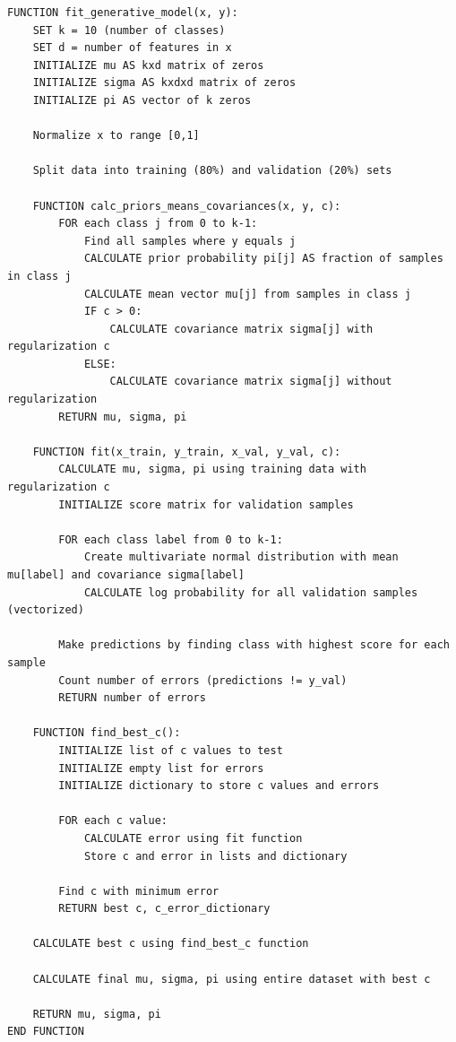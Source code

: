 \documentclass{article}
\begin{document}
\begin{lstlisting}[style=pseudocodestyle]
FUNCTION fit_generative_model(x, y):
    SET k = 10 (number of classes)
    SET d = number of features in x
    INITIALIZE mu AS kxd matrix of zeros
    INITIALIZE sigma AS kxdxd matrix of zeros
    INITIALIZE pi AS vector of k zeros

    Normalize x to range [0,1]

    Split data into training (80%) and validation (20%) sets

    FUNCTION calc_priors_means_covariances(x, y, c):
        FOR each class j from 0 to k-1:
            Find all samples where y equals j
            CALCULATE prior probability pi[j] AS fraction of samples in class j
            CALCULATE mean vector mu[j] from samples in class j
            IF c > 0:
                CALCULATE covariance matrix sigma[j] with regularization c
            ELSE:
                CALCULATE covariance matrix sigma[j] without regularization
        RETURN mu, sigma, pi

    FUNCTION fit(x_train, y_train, x_val, y_val, c):
        CALCULATE mu, sigma, pi using training data with regularization c
        INITIALIZE score matrix for validation samples

        FOR each class label from 0 to k-1:
            Create multivariate normal distribution with mean mu[label] and covariance sigma[label]
            CALCULATE log probability for all validation samples (vectorized)

        Make predictions by finding class with highest score for each sample
        Count number of errors (predictions != y_val)
        RETURN number of errors

    FUNCTION find_best_c():
        INITIALIZE list of c values to test
        INITIALIZE empty list for errors
        INITIALIZE dictionary to store c values and errors

        FOR each c value:
            CALCULATE error using fit function
            Store c and error in lists and dictionary

        Find c with minimum error
        RETURN best c, c_error_dictionary

    CALCULATE best c using find_best_c function

    CALCULATE final mu, sigma, pi using entire dataset with best c

    RETURN mu, sigma, pi
END FUNCTION
\end{lstlisting}
\end{document}
